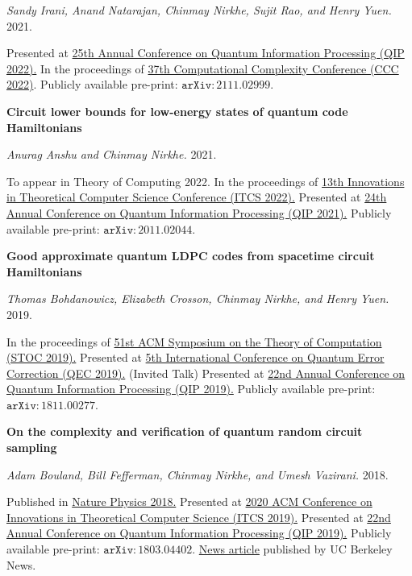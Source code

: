\documentclass[11pt]{article}
\begin{document}
\begin{enumerate}[{leftmargin=*,start=11,label=[\arabic*]\addtocounter{enumi}{-2}}]
\emph{Sandy Irani, Anand Natarajan, Chinmay Nirkhe, Sujit Rao, and Henry Yuen.} 2021.

Presented at \href{https://web.cvent.com/event/8adf8248-432b-499c-91e2-63b83ba3f69e/summary}{25th Annual Conference on Quantum Information Processing (QIP 2022).}
In the proceedings of \href{https://www.computationalcomplexity.org/}{37th Computational Complexity Conference (CCC 2022)}. Publicly available pre-print: \href{https://arxiv.org/abs/2111.02999}{$\mathtt{arXiv:2111.02999}$}.

\item \textbf{Circuit lower bounds for low-energy states of quantum code Hamiltonians}

\emph{Anurag Anshu and Chinmay Nirkhe.} 2021.

To appear in Theory of Computing 2022. In the proceedings of \href{http://itcs-conf.org/itcs22/itcs22-cfp.html}{13th Innovations in Theoretical Computer Science Conference (ITCS 2022).}
Presented at \href{https://www.mcqst.de/qip2021/}{24th Annual Conference on Quantum Information Processing (QIP 2021).} Publicly available pre-print: \href{https://arxiv.org/abs/2011.02044}{$\mathtt{arXiv:2011.02044}$}.

\item \textbf{Good approximate quantum LDPC codes from spacetime circuit Hamiltonians}

\emph{Thomas Bohdanowicz, Elizabeth Crosson, Chinmay Nirkhe, and Henry Yuen.} 2019.

In the proceedings of \href{http://acm-stoc.org/stoc2019/}{51st ACM Symposium on the Theory of Computation (STOC 2019).}
Presented at \href{http://qec19.iopconfs.org/home}{5th International Conference on Quantum Error Correction (QEC 2019).} (Invited Talk)
Presented at \href{https://jila.colorado.edu/qip2019/}{22nd Annual Conference on Quantum Information Processing (QIP 2019).}
Publicly available pre-print: \href{https://arxiv.org/abs/1811.00277}{$\mathtt{arXiv:1811.00277}$}.

\item \textbf{On the complexity and verification of quantum random circuit sampling}

\emph{Adam Bouland, Bill Fefferman, Chinmay Nirkhe, and Umesh Vazirani.} 2018.

Published in \href{https://www.nature.com/articles/s41567-018-0318-2}{Nature Physics 2018.}
Presented at \href{http://itcs-conf.org/itcs19/itcs19-cfp.html}{2020 ACM Conference on Innovations in Theoretical Computer Science (ITCS 2019).}
Presented at \href{https://jila.colorado.edu/qip2019/}{22nd Annual Conference on Quantum Information Processing (QIP 2019).}
Publicly available pre-print: \href{https://arxiv.org/abs/1803.04402}{$\mathtt{arXiv:1803.04402}$}.
\href{https://news.berkeley.edu/2018/10/29/berkeley-computer-theorists-show-path-to-verifying-that-quantum-beats-classical/}{News article} published by UC Berkeley News.


\end{enumerate}
\end{document}
